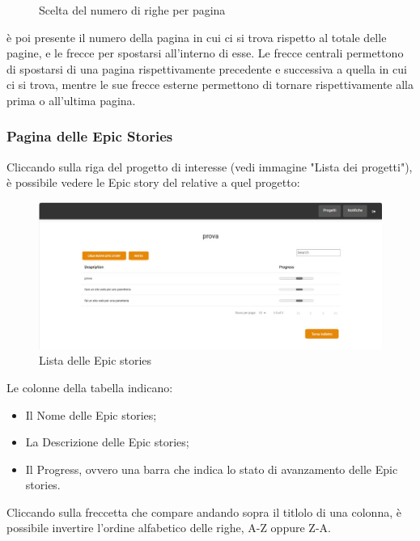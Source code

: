 \documentclass{article}
\begin{document}
\begin{itemize}
\begin{figure}[H]
      \caption{Scelta del numero di righe per pagina}
      \label{nrighepad}
    \end{figure} 
    è poi presente il numero della pagina in cui ci si trova rispetto al totale delle pagine, e le frecce per spostarsi all'interno di esse. Le frecce centrali permettono di spostarsi di una pagina rispettivamente precedente e successiva a quella in cui ci si trova, mentre le sue frecce esterne permettono di tornare rispettivamente alla prima o all'ultima pagina.
\end{itemize}

\subsubsection{Pagina delle Epic Stories}
Cliccando sulla riga del progetto di interesse (vedi immagine "Lista dei progetti"), è possibile vedere le Epic story del relative a quel progetto:
    \begin{figure}[H]
      \centering
      \includegraphics[width=\textwidth]{documenti/Screenshot manuale utente/epic pm.jpeg}
      \caption{Lista delle Epic stories}
      \label{listaepic}
    \end{figure} 
Le colonne della tabella indicano:
\begin{itemize}
    \item Il Nome delle Epic stories;
    \item La Descrizione delle Epic stories;
    \item Il Progress, ovvero una barra che indica lo stato di avanzamento delle Epic stories.
\end{itemize}
Cliccando sulla freccetta che compare andando sopra il titlolo di una colonna, è possibile invertire l'ordine alfabetico delle righe, A-Z oppure Z-A.\\\\
\end{document}

